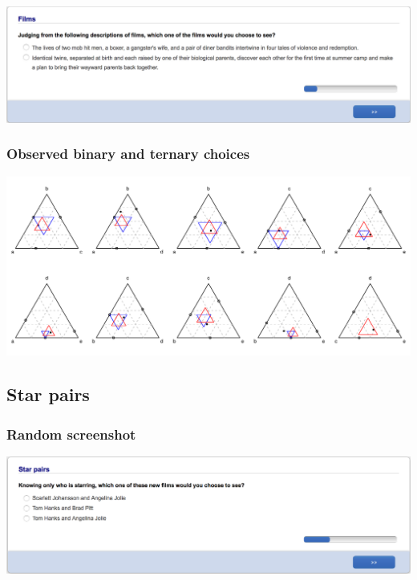\documentclass[11pt,letter]{article}
\begin{document}
\includegraphics[width=15cm]{Population_study_design/screenshot_films.png}

\subsubsection*{Observed binary and ternary choices}

\includegraphics[width=15cm]{./Population_study_data/Simplexes/films.pdf}

\pagebreak

\subsection*{Star pairs}



\subsubsection*{Random screenshot}

\includegraphics[width=15cm]{Population_study_design/screenshot_star_pairs.png}
\end{document}
